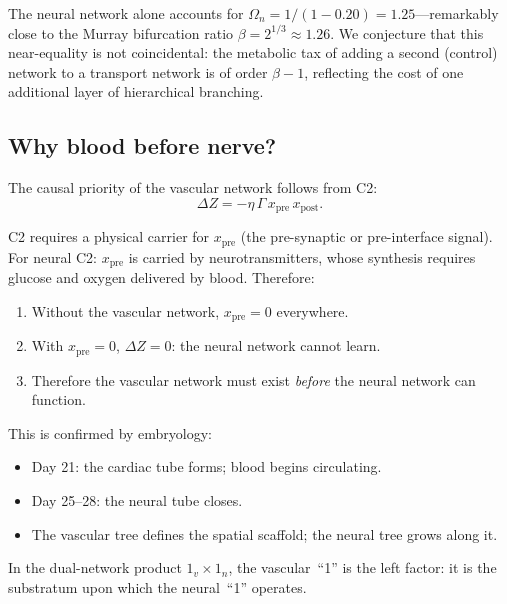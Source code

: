 \documentclass[aps,pre,twocolumn,superscriptaddress,longbibliography]{revtex4-2}
\begin{document}
The neural network alone accounts for
$\Omega_n = 1/(1 - 0.20) = 1.25$---remarkably close to
the Murray bifurcation ratio $\beta = 2^{1/3} \approx 1.26$.
We conjecture that this near-equality is not coincidental:
the metabolic tax of adding a second (control) network
to a transport network is of order $\beta - 1$,
reflecting the cost of one additional layer of hierarchical
branching.


\subsection{Why blood before nerve?}
\label{sec:blood-first}

The causal priority of the vascular network follows from
C2:
\begin{equation}
  \Delta Z = -\eta\,\Gamma\,x_{\text{pre}}\,x_{\text{post}}.
  \label{eq:C2-recap}
\end{equation}

C2 requires a physical carrier for $x_{\text{pre}}$
(the pre-synaptic or pre-interface signal).
For neural C2: $x_{\text{pre}}$ is carried by
neurotransmitters, whose synthesis requires
glucose and oxygen delivered by blood.
Therefore:
\begin{enumerate}
  \item Without the vascular network, $x_{\text{pre}} = 0$
    everywhere.
  \item With $x_{\text{pre}} = 0$, $\Delta Z = 0$:
    the neural network cannot learn.
  \item Therefore the vascular network must exist
    \emph{before} the neural network can function.
\end{enumerate}

This is confirmed by embryology:
\begin{itemize}
  \item Day 21: the cardiac tube forms; blood begins
    circulating.
  \item Day 25--28: the neural tube closes.
  \item The vascular tree defines the spatial scaffold;
    the neural tree grows along it.
\end{itemize}

In the dual-network product $1_v \times 1_n$,
the vascular~``1'' is the left factor:
it is the substratum upon which the neural~``1'' operates.


\end{document}
